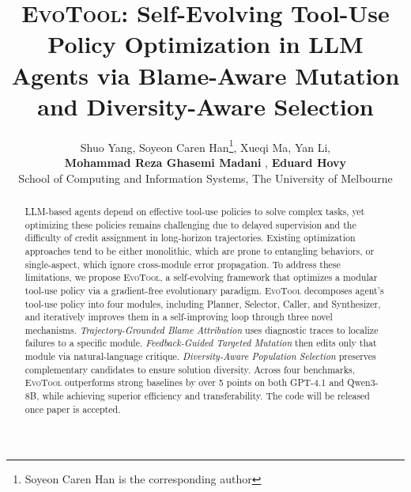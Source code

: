 \documentclass[11pt]{article}
\title{\textsc{EvoTool}: Self-Evolving Tool-Use Policy Optimization in LLM Agents via Blame-Aware Mutation and Diversity-Aware Selection}
\author{Shuo Yang,
Soyeon Caren Han\thanks{Soyeon Caren Han is the corresponding author},
Xueqi Ma, 
Yan Li, \\
{\bf Mohammad Reza Ghasemi Madani },
{\bf Eduard Hovy} \\
School of Computing and Information Systems, The University of Melbourne \\
}
\begin{document}
\maketitle
\begin{abstract}
LLM-based agents depend on effective tool-use policies to solve complex tasks, yet optimizing these policies remains challenging due to delayed supervision and the difficulty of credit assignment in long-horizon trajectories. Existing optimization approaches tend to be either monolithic, which are prone to entangling behaviors, or single-aspect, which ignore cross-module error propagation. To address these limitations, we propose \textsc{EvoTool}, a self-evolving framework that optimizes a modular tool-use policy via a gradient-free evolutionary paradigm.
\textsc{EvoTool} decomposes agent’s tool-use policy into four modules, including Planner, Selector, Caller, and Synthesizer, and iteratively improves them in a self-improving loop through three novel mechanisms. \textit{Trajectory-Grounded Blame Attribution} uses diagnostic traces to localize failures to a specific module. \textit{Feedback-Guided Targeted Mutation} then edits only that module via natural-language critique. \textit{Diversity-Aware Population Selection} preserves complementary candidates to ensure solution diversity. Across four benchmarks, \textsc{EvoTool} outperforms strong baselines by over 5 points on both GPT-4.1 and Qwen3-8B, while achieving superior efficiency and transferability. The code will be released once paper is accepted.


 




\end{abstract}
\end{document}
